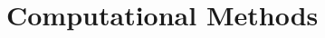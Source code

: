 \documentclass[final]{elsarticle}
\providecommand{\conv}{\text{conv}}
\theoremstyle{remark}
\theoremstyle{definition}
\begin{document}

\section{Computational Methods}\label{sec:computational:methods}
%
%
%
\end{document}
